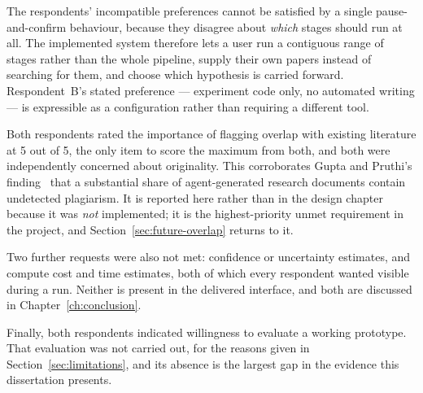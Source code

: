 \begin{description}[style=unboxed,leftmargin=0pt,itemsep=0.35em]
\item[D5 --- Co-pilot control became stage selection, not merely stage pausing.] The
respondents' incompatible preferences cannot be satisfied by a single pause-and-confirm
behaviour, because they disagree about \emph{which} stages should run at all. The implemented
system therefore lets a user run a contiguous range of stages rather than the whole pipeline,
supply their own papers instead of searching for them, and choose which hypothesis is carried
forward. Respondent~B's stated preference --- experiment code only, no automated writing ---
is expressible as a configuration rather than requiring a different tool.

\item[D6 --- Overlap detection was specified, and not delivered.] Both respondents rated the
importance of flagging overlap with existing literature at 5 out of 5, the only item to score
the maximum from both, and both were independently concerned about originality. This
corroborates Gupta and Pruthi's finding~\cite{gupta2025glitters} that a substantial share of
agent-generated research documents contain undetected plagiarism. It is reported here rather
than in the design chapter because it was \emph{not} implemented; it is the highest-priority
unmet requirement in the project, and Section~\ref{sec:future-overlap} returns to it.

\end{description}

Two further requests were also not met: confidence or uncertainty estimates, and compute cost
and time estimates, both of which every respondent wanted visible during a run. Neither is
present in the delivered interface, and both are discussed in Chapter~\ref{ch:conclusion}.

Finally, both respondents indicated willingness to evaluate a working prototype. That
evaluation was not carried out, for the reasons given in Section~\ref{sec:limitations}, and
its absence is the largest gap in the evidence this dissertation presents.
